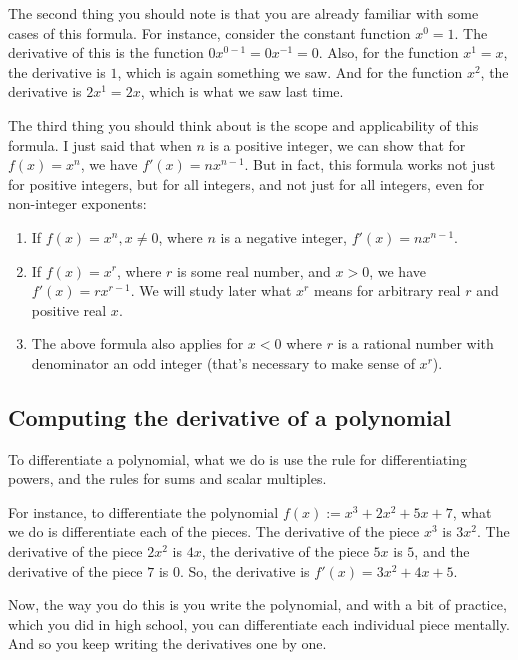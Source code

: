 \documentclass[10pt]{amsart}
\begin{document}
The second thing you should note is that you are already familiar with
some cases of this formula. For instance, consider the constant
function $x^0 = 1$. The derivative of this is the function $0x^{0-1} =
0x^{-1} = 0$. Also, for the function $x^1 = x$, the derivative is $1$,
which is again something we saw. And for the function $x^2$, the
derivative is $2x^1 = 2x$, which is what we saw last time.

The third thing you should think about is the scope and applicability
of this formula. I just said that when $n$ is a positive integer, we
can show that for $f(x) = x^n$, we have $f'(x) = nx^{n-1}$. But in
fact, this formula works not just for positive integers, but for all
integers, and not just for all integers, even for non-integer
exponents:

\begin{enumerate}
\item If $f(x) = x^n, x \ne 0$, where $n$ is a negative integer,
  $f'(x) = nx^{n-1}$.
\item If $f(x) = x^r$, where $r$ is some real number, and $x > 0$, we
  have $f'(x) = rx^{r-1}$. We will study later what $x^r$ means for
  arbitrary real $r$ and positive real $x$.
\item The above formula also applies for $x < 0$ where $r$ is a
  rational number with denominator an odd integer (that's necessary to
  make sense of $x^r$).
\end{enumerate}

\subsection{Computing the derivative of a polynomial}

To differentiate a polynomial, what we do is use the rule for
differentiating powers, and the rules for sums and scalar multiples.

For instance, to differentiate the polynomial $f(x) := x^3 + 2x^2 + 5x
+ 7$, what we do is differentiate each of the pieces. The derivative
of the piece $x^3$ is $3x^2$. The derivative of the piece $2x^2$ is
$4x$, the derivative of the piece $5x$ is $5$, and the derivative of
the piece $7$ is $0$. So, the derivative is $f'(x) = 3x^2 + 4x + 5$.

Now, the way you do this is you write the polynomial, and with a bit
of practice, which you did in high school, you can
differentiate each individual piece mentally. And so you keep writing
the derivatives one by one.
\end{document}
